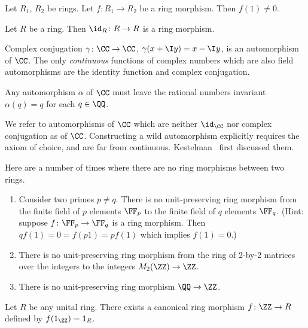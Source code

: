 \begin{theorem}
Let $R_{1}$, $R_{2}$ be rings. Let $f\colon R_{1}\to R_{2}$ be a ring
morphism. Then $f(1)\neq0$.
\end{theorem}

\begin{example}%
Let $R$ be a ring. Then $\id_{R}\colon R\to R$ is a ring morphism.
\end{example}

\begin{example}
Complex conjugation $\gamma\colon\CC\to\CC$, $\gamma(x+\I y)=x-\I y$,
is an automorphism of $\CC$. The only \emph{continuous} functions of
complex numbers which are also field automorphisms are the identity
function and complex conjugation.

Any automorphism $\alpha$ of $\CC$ must leave the rational numbers
invariant $\alpha(q)=q$ for each $q\in\QQ$.

We refer to automorphisms of $\CC$ which are neither $\id_{\CC}$ nor
complex conjugation as  of $\CC$.
Constructing a wild automorphism explicitly requires the axiom of choice,
and are far from continuous. Kestelman~\cite{kestelman1951automorphisms}
first discussed them.
\end{example}

\begin{example}
Here are a number of times where there are no ring morphisms between
two rings.
\begin{enumerate}
\item Consider two primes $p\neq q$. There is no unit-preserving ring
morphism from the finite field of $p$ elements $\FF_{p}$ to the finite
field of $q$ elements $\FF_{q}$. (Hint: suppose
$f\colon\FF_{p}\to\FF_{q}$ is a ring morphism. Then
$qf(1)=0=f(p1)=pf(1)$ which implies $f(1)=0$.)
\item  There is no unit-preserving ring morphism from the ring of 2-by-2
matrices over the integers to the integers $M_{2}(\ZZ)\to\ZZ$.
\item There is no unit-preserving ring morphism $\QQ\to\ZZ$.
\end{enumerate}
\end{example}

\begin{example}
Let $R$ be any unital ring. There exists a canonical ring morphism
$f\colon\ZZ\to R$ defined by $f(1_{\ZZ})=1_{R}$.
\end{example}

